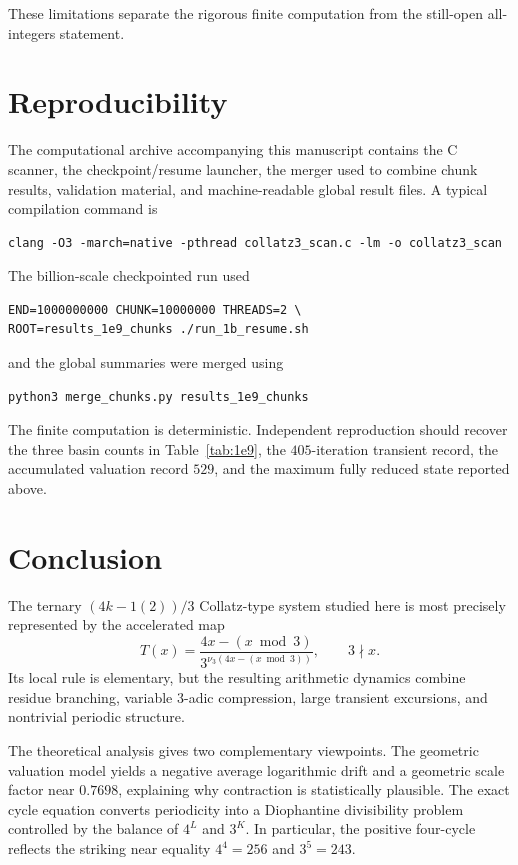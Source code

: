 \documentclass[11pt]{article}
\newcommand{\vthree}{\nu_3}
\newcommand{\Tmap}{T}
\begin{document}
These limitations separate the rigorous finite computation from the still-open all-integers statement.

\section{Reproducibility}
The computational archive accompanying this manuscript contains the C scanner, the checkpoint/resume launcher, the merger used to combine chunk results, validation material, and machine-readable global result files.  A typical compilation command is
\begin{verbatim}
clang -O3 -march=native -pthread collatz3_scan.c -lm -o collatz3_scan
\end{verbatim}
The billion-scale checkpointed run used
\begin{verbatim}
END=1000000000 CHUNK=10000000 THREADS=2 \
ROOT=results_1e9_chunks ./run_1b_resume.sh
\end{verbatim}
and the global summaries were merged using
\begin{verbatim}
python3 merge_chunks.py results_1e9_chunks
\end{verbatim}
The finite computation is deterministic.  Independent reproduction should recover the three basin counts in Table~\ref{tab:1e9}, the $405$-iteration transient record, the accumulated valuation record $529$, and the maximum fully reduced state reported above.

\section{Conclusion}
The ternary $(4k-1(2))/3$ Collatz-type system studied here is most precisely represented by the accelerated map
\[
\Tmap(x)=\frac{4x-(x\bmod3)}{3^{\vthree(4x-(x\bmod3))}},
\qquad3\nmid x.
\]
Its local rule is elementary, but the resulting arithmetic dynamics combine residue branching, variable $3$-adic compression, large transient excursions, and nontrivial periodic structure.

The theoretical analysis gives two complementary viewpoints.  The geometric valuation model yields a negative average logarithmic drift and a geometric scale factor near $0.7698$, explaining why contraction is statistically plausible.  The exact cycle equation converts periodicity into a Diophantine divisibility problem controlled by the balance of $4^L$ and $3^K$.  In particular, the positive four-cycle reflects the striking near equality $4^4=256$ and $3^5=243$.
\end{document}
